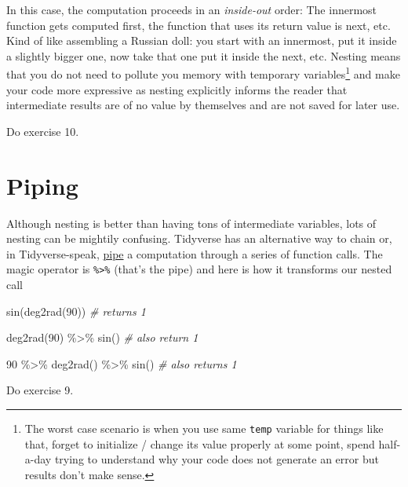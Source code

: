 \documentclass[
]{book}
\newenvironment{Shaded}{\begin{snugshade}}{\end{snugshade}}
\newcommand{\CommentTok}[1]{\textcolor[rgb]{0.56,0.35,0.01}{\textit{#1}}}
\newcommand{\DecValTok}[1]{\textcolor[rgb]{0.00,0.00,0.81}{#1}}
\newcommand{\FunctionTok}[1]{\textcolor[rgb]{0.00,0.00,0.00}{#1}}
\newcommand{\NormalTok}[1]{#1}
\newcommand{\SpecialCharTok}[1]{\textcolor[rgb]{0.00,0.00,0.00}{#1}}
\begin{document}
In this case, the computation proceeds in an \emph{inside-out} order: The innermost function gets computed first, the function that uses its return value is next, etc. Kind of like assembling a Russian doll: you start with an innermost, put it inside a slightly bigger one, now take that one put it inside the next, etc. Nesting means that you do not need to pollute you memory with temporary variables\footnote{The worst case scenario is when you use same \texttt{temp} variable for things like that, forget to initialize / change its value properly at some point, spend half-a-day trying to understand why your code does not generate an error but results don't make sense.} and make your code more expressive as nesting explicitly informs the reader that intermediate results are of no value by themselves and are not saved for later use.

Do exercise 10.

\hypertarget{pipe}{%
\section{Piping}\label{pipe}}

Although nesting is better than having tons of intermediate variables, lots of nesting can be mightily confusing. Tidyverse has an alternative way to chain or, in Tidyverse-speak, \href{https://magrittr.tidyverse.org/reference/pipe.html}{pipe} a computation through a series of function calls. The magic operator is \texttt{\%\textgreater{}\%} (that's the pipe) and here is how it transforms our nested call

\begin{Shaded}
\begin{Highlighting}[]
\FunctionTok{sin}\NormalTok{(}\FunctionTok{deg2rad}\NormalTok{(}\DecValTok{90}\NormalTok{)) }\CommentTok{\# returns 1}

\FunctionTok{deg2rad}\NormalTok{(}\DecValTok{90}\NormalTok{) }\SpecialCharTok{\%\textgreater{}\%} \FunctionTok{sin}\NormalTok{() }\CommentTok{\# also return 1}

\DecValTok{90} \SpecialCharTok{\%\textgreater{}\%} \FunctionTok{deg2rad}\NormalTok{() }\SpecialCharTok{\%\textgreater{}\%} \FunctionTok{sin}\NormalTok{() }\CommentTok{\# also returns 1}
\end{Highlighting}
\end{Shaded}

Do exercise 9.
\end{document}
